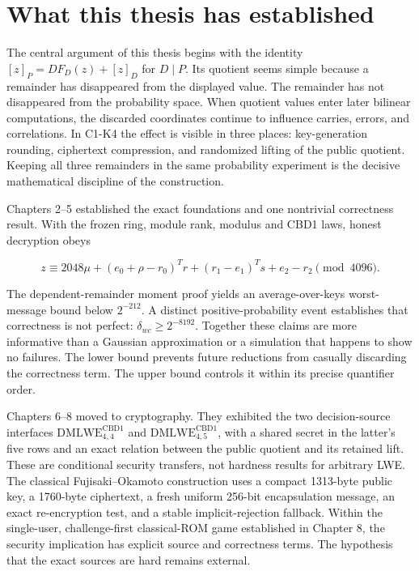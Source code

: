 \documentclass[
  11pt,
  a4paper,
  oneside]{report}
\begin{document}
\section{What this thesis has
established}\label{what-this-thesis-has-established}

The central argument of this thesis begins with the identity
\([z]_P=DF_D(z)+[z]_D\) for \(D\mid P\). Its quotient seems simple
because a remainder has disappeared from the displayed value. The
remainder has not disappeared from the probability space. When quotient
values enter later bilinear computations, the discarded coordinates
continue to influence carries, errors, and correlations. In C1-K4 the
effect is visible in three places: key-generation rounding, ciphertext
compression, and randomized lifting of the public quotient. Keeping all
three remainders in the same probability experiment is the decisive
mathematical discipline of the construction.

Chapters 2--5 established the exact foundations and one nontrivial
correctness result. With the frozen ring, module rank, modulus and CBD1
laws, honest decryption obeys

\[
z\equiv2048\mu+
(e_0+\rho-r_0)^Tr+(r_1-e_1)^Ts+e_2-r_2
\pmod{4096}.
\]

The dependent-remainder moment proof yields an average-over-keys
worst-message bound below \(2^{-212}\). A distinct positive-probability
event establishes that correctness is not perfect:
\(\delta_{wc}\ge2^{-8192}\). Together these claims are more informative
than a Gaussian approximation or a simulation that happens to show no
failures. The lower bound prevents future reductions from casually
discarding the correctness term. The upper bound controls it within its
precise quantifier order.

Chapters 6--8 moved to cryptography. They exhibited the two
decision-source interfaces \(\mathrm{DMLWE}_{4,4}^{\mathrm{CBD1}}\) and
\(\mathrm{DMLWE}_{4,5}^{\mathrm{CBD1}}\), with a shared secret in the
latter's five rows and an exact relation between the public quotient and
its retained lift. These are conditional security transfers, not
hardness results for arbitrary LWE. The classical Fujisaki--Okamoto
construction uses a compact 1313-byte public key, a 1760-byte
ciphertext, a fresh uniform 256-bit encapsulation message, an exact
re-encryption test, and a stable implicit-rejection fallback. Within the
single-user, challenge-first classical-ROM game established in Chapter
8, the security implication has explicit source and correctness terms.
The hypothesis that the exact sources are hard remains external.
\end{document}
